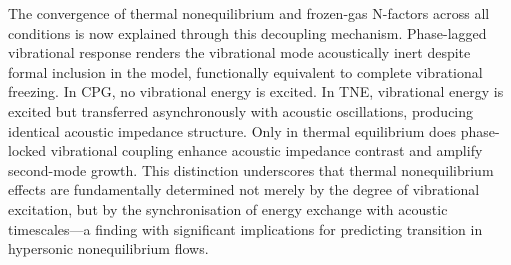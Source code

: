 
The convergence of thermal nonequilibrium and frozen-gas N-factors across all conditions is now explained through this decoupling mechanism. Phase-lagged vibrational response renders the vibrational mode acoustically inert despite formal inclusion in the model, functionally equivalent to complete vibrational freezing. In \gls{CPG}, no vibrational energy is excited. In \gls{TNE}, vibrational energy is excited but transferred asynchronously with acoustic oscillations, producing identical acoustic impedance structure. Only in thermal equilibrium does phase-locked vibrational coupling enhance acoustic impedance contrast and amplify second-mode growth. This distinction underscores that thermal nonequilibrium effects are fundamentally determined not merely by the degree of vibrational excitation, but by the synchronisation of energy exchange with acoustic timescales—a finding with significant implications for predicting transition in hypersonic nonequilibrium flows.





